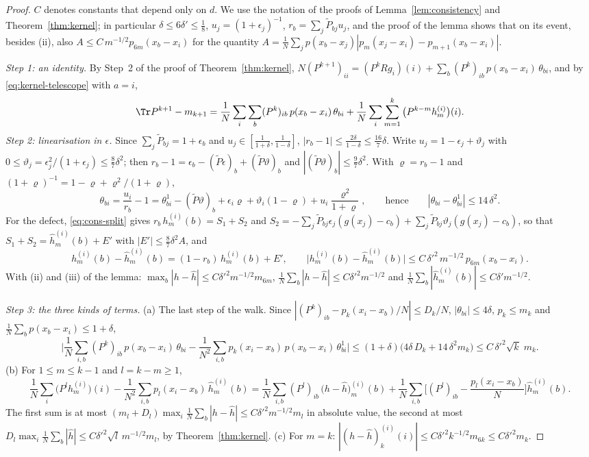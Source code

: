 \begin{proof}
$C$ denotes constants that depend only on $d$. We use the notation of the proofs of Lemma~\ref{lem:consistency} and Theorem~\ref{thm:kernel}; in particular $\delta\le6\delta'\le\frac18$, $u_j=(1+\epsilon_j)^{-1}$, $r_b=\sum_j\tilde P_{bj}u_j$, and the proof of the lemma shows that on its event, besides (ii), also $A\le C\,m^{-1/2}p_{6m}(x_b-x_i)$ for the quantity $A=\frac1N\sum_jp(x_b-x_j)|p_m(x_j-x_i)-p_{m+1}(x_b-x_i)|$.

\emph{Step 1: an identity.} By Step~2 of the proof of Theorem~\ref{thm:kernel}, $N(P^{k+1})_{ii}=(P^kRg_i)(i)+\sum_b(P^k)_{ib}\,p(x_b-x_i)\,\theta_{bi}$, and by \eqref{eq:kernel-telescope} with $a=i$,
\[
\Tr P^{k+1}-m_{k+1}=\frac1N\sum_i\sum_b(P^k)_{ib}\,p(x_b-x_i)\,\theta_{bi}+\frac1N\sum_i\sum_{m=1}^k\big(P^{k-m}h^{(i)}_m\big)(i).
\]
\emph{Step 2: linearisation in $\epsilon$.} Since $\sum_j\tilde P_{bj}=1+\epsilon_b$ and $u_j\in[\frac1{1+\delta},\frac1{1-\delta}]$, $|r_b-1|\le\frac{2\delta}{1-\delta}\le\frac{16}7\delta$. Write $u_j=1-\epsilon_j+\vartheta_j$ with $0\le\vartheta_j=\epsilon_j^2/(1+\epsilon_j)\le\frac87\delta^2$; then $r_b-1=\epsilon_b-(\tilde P\epsilon)_b+(\tilde P\vartheta)_b$ and $|(\tilde P\vartheta)_b|\le\frac97\delta^2$. With $\varrho=r_b-1$ and $(1+\varrho)^{-1}=1-\varrho+\varrho^2/(1+\varrho)$,
\[
\theta_{bi}=\frac{u_i}{r_b}-1=\theta^1_{bi}-(\tilde P\vartheta)_b+\epsilon_i\varrho+\vartheta_i(1-\varrho)+u_i\frac{\varrho^2}{1+\varrho},\qquad\text{hence}\qquad|\theta_{bi}-\theta^1_{bi}|\le14\,\delta^2 .
\]
For the defect, \eqref{eq:cons-split} gives $r_b\,h^{(i)}_m(b)=S_1+S_2$ and $S_2=-\sum_j\tilde P_{bj}\epsilon_j(g(x_j)-c_b)+\sum_j\tilde P_{bj}\vartheta_j(g(x_j)-c_b)$, so that $S_1+S_2=\hat h^{(i)}_m(b)+E'$ with $|E'|\le\frac87\delta^2A$, and
\[
h^{(i)}_m(b)-\hat h^{(i)}_m(b)=(1-r_b)\,h^{(i)}_m(b)+E',\qquad\big|h^{(i)}_m(b)-\hat h^{(i)}_m(b)\big|\le C\,\delta'^2\,m^{-1/2}\,p_{6m}(x_b-x_i).
\]
With (ii) and (iii) of the lemma: $\max_b|h-\hat h|\le C\delta'^2m^{-1/2}m_{6m}$, $\frac1N\sum_b|h-\hat h|\le C\delta'^2m^{-1/2}$ and $\frac1N\sum_b|\hat h^{(i)}_m(b)|\le C\delta'm^{-1/2}$.

\emph{Step 3: the three kinds of terms.} (a) The last step of the walk. Since $|(P^k)_{ib}-p_k(x_i-x_b)/N|\le D_k/N$, $|\theta_{bi}|\le4\delta$, $p_k\le m_k$ and $\frac1N\sum_bp(x_b-x_i)\le1+\delta$,
\[
\Big|\frac1N\sum_{i,b}(P^k)_{ib}\,p(x_b-x_i)\,\theta_{bi}-\frac1{N^2}\sum_{i,b}p_k(x_i-x_b)\,p(x_b-x_i)\,\theta^1_{bi}\Big|\le(1+\delta)\big(4\delta\,D_k+14\,\delta^2m_k\big)\le C\,\delta'^2\sqrt k\;m_k .
\]
(b) For $1\le m\le k-1$ and $l=k-m\ge1$,
\[
\frac1N\sum_i\big(P^lh^{(i)}_m\big)(i)-\frac1{N^2}\sum_{i,b}p_l(x_i-x_b)\,\hat h^{(i)}_m(b)
=\frac1N\sum_{i,b}(P^l)_{ib}\,\big(h-\hat h\big)^{(i)}_m(b)+\frac1N\sum_{i,b}\Big[(P^l)_{ib}-\frac{p_l(x_i-x_b)}N\Big]\hat h^{(i)}_m(b).
\]
The first sum is at most $(m_l+D_l)\max_i\frac1N\sum_b|h-\hat h|\le C\delta'^2m^{-1/2}m_l$ in absolute value, the second at most $D_l\max_i\frac1N\sum_b|\hat h|\le C\delta'^2\sqrt l\,m^{-1/2}m_l$, by Theorem~\ref{thm:kernel}. (c) For $m=k$: $|(h-\hat h)^{(i)}_k(i)|\le C\delta'^2k^{-1/2}m_{6k}\le C\delta'^2m_k$.


\end{proof}
